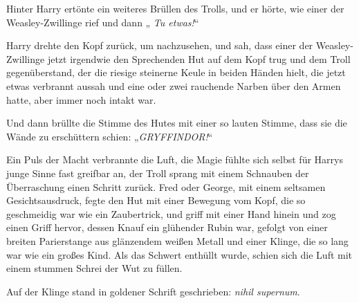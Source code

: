 Hinter Harry ertönte ein weiteres Brüllen des Trolls, und er hörte, wie einer der Weasley-Zwillinge  rief und dann „\emph{ Tu etwas!}“

Harry drehte den Kopf zurück, um nachzusehen, und sah, dass einer der Weasley-Zwillinge jetzt irgendwie den Sprechenden Hut auf dem Kopf trug und dem Troll gegenüberstand, der die riesige steinerne Keule in beiden Händen hielt, die jetzt etwas verbrannt aussah und eine oder zwei rauchende Narben über den Armen hatte, aber immer noch intakt war.

Und dann brüllte die Stimme des Hutes mit einer so lauten Stimme, dass sie die Wände zu erschüttern schien: „\emph{GRYFFINDOR!}“

Ein Puls der Macht verbrannte die Luft, die Magie fühlte sich selbst für Harrys junge Sinne fast greifbar an, der Troll sprang mit einem Schnauben der Überraschung einen Schritt zurück. Fred oder George, mit einem seltsamen Gesichtsausdruck, fegte den Hut mit einer Bewegung vom Kopf, die so geschmeidig war wie ein Zaubertrick, und griff mit einer Hand hinein und zog einen Griff hervor, dessen Knauf ein glühender Rubin war, gefolgt von einer breiten Parierstange aus glänzendem weißen Metall und einer Klinge, die so lang war wie ein großes Kind. Als das Schwert enthüllt wurde, schien sich die Luft mit einem stummen Schrei der Wut zu füllen.

Auf der Klinge stand in goldener Schrift geschrieben: \emph{nihil supernum}.

